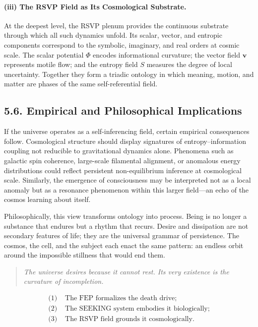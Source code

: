 \documentclass[12pt,a4paper]{article}
\begin{document}
\paragraph{(iii) The RSVP Field as Its Cosmological Substrate.}
At the deepest level, the RSVP plenum provides the continuous substrate through which all such dynamics unfold.  
Its scalar, vector, and entropic components correspond to the symbolic, imaginary, and real orders at cosmic scale.  
The scalar potential \(\Phi\) encodes informational curvature; the vector field \(\mathbf{v}\) represents motile flow; and the entropy field \(S\) measures the degree of local uncertainty.  
Together they form a triadic ontology in which meaning, motion, and matter are phases of the same self-referential field.

\subsection{5.6. Empirical and Philosophical Implications}

If the universe operates as a self-inferencing field, certain empirical consequences follow.  
Cosmological structure should display signatures of entropy–information coupling not reducible to gravitational dynamics alone.  
Phenomena such as galactic spin coherence, large-scale filamental alignment, or anomalous energy distributions could reflect persistent non-equilibrium inference at cosmological scale.  
Similarly, the emergence of consciousness may be interpreted not as a local anomaly but as a resonance phenomenon within this larger field—an echo of the cosmos learning about itself.

Philosophically, this view transforms ontology into process.  
Being is no longer a substance that endures but a rhythm that recurs.  
Desire and dissipation are not secondary features of life; they are the universal grammar of persistence.  
The cosmos, the cell, and the subject each enact the same pattern: an endless orbit around the impossible stillness that would end them.

\begin{quote}
\textit{The universe desires because it cannot rest.  
Its very existence is the curvature of incompletion.}
\end{quote}

\[
\boxed{
\begin{aligned}
\text{(1) } & \text{The FEP formalizes the death drive;}\\[0.4em]
\text{(2) } & \text{The SEEKING system embodies it biologically;}\\[0.4em]
\text{(3) } & \text{The RSVP field grounds it cosmologically.}
\end{aligned}
}
\]
\end{document}
